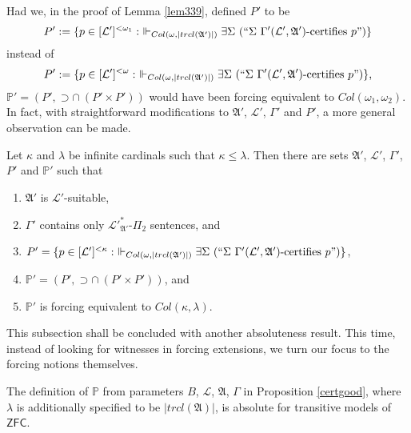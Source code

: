 \documentclass[12pt]{article}
\numberwithin{equation}{section}
\begin{document}
Had we, in the proof of Lemma \ref{lem339}, defined $P'$ to be
\begin{equation*}
    P' := \{p \in [\mathcal{L}']^{< \omega_1} : \ \Vdash_{Col(\omega, |trcl(\mathfrak{A}')|)} \exists \Sigma \ (``\Sigma \ \Gamma'(\mathcal{L}', \mathfrak{A}') \text{-certifies } p")\}
\end{equation*}
instead of
\begin{equation*}
    P' := \{p \in [\mathcal{L}']^{< \omega} : \ \Vdash_{Col(\omega, |trcl(\mathfrak{A}')|)} \exists \Sigma \ (``\Sigma \ \Gamma'(\mathcal{L}', \mathfrak{A}') \text{-certifies } p")\} \text{,}
\end{equation*}
$\mathbb{P}' = (P', \supset \cap \ (P' \times P'))$ would have been forcing equivalent to $Col(\omega_1, \omega_2)$. In fact, with straightforward modifications to $\mathfrak{A}'$, $\mathcal{L}'$, $\Gamma'$ and $P'$, a more general observation can be made.

\begin{ob}\label{ob259}
Let $\kappa$ and $\lambda$ be infinite cardinals such that $\kappa \leq \lambda$. Then there are sets $\mathfrak{A}'$, $\mathcal{L}'$, $\Gamma'$, $P'$ and $\mathbb{P}'$ such that
\begin{enumerate}[label=(\alph*)]
    \item $\mathfrak{A}'$ is $\mathcal{L}'$-suitable, 
    \item $\Gamma'$ contains only $\mathcal{L}'^*_{\mathfrak{A}'}$-$\Pi_2$ sentences, and
    \item $P' = \{p \in [\mathcal{L}']^{< \kappa} : \ \Vdash_{Col(\omega, |trcl(\mathfrak{A}')|)} \exists \Sigma \ (``\Sigma \ \Gamma' (\mathcal{L}', \mathfrak{A}') \text{-certifies } p")\}$,
    \item $\mathbb{P}' = (P', \supset \cap \ (P' \times P'))$, and
    \item $\mathbb{P}'$ is forcing equivalent to $Col(\kappa, \lambda)$.
\end{enumerate}
\end{ob}

This subsection shall be concluded with another absoluteness result. This time, instead of looking for witnesses in forcing extensions, we turn our focus to the forcing notions themselves.

\begin{lem}\label{Pisabs}
The definition of $\mathbb{P}$ from parameters $B$, $\mathcal{L}$, $\mathfrak{A}$, $\Gamma$ in Proposition \ref{certgood}, where $\lambda$ is additionally specified to be $|trcl(\mathfrak{A})|$, is absolute for transitive models of $\mathsf{ZFC}$.
\end{lem}
\end{document}
